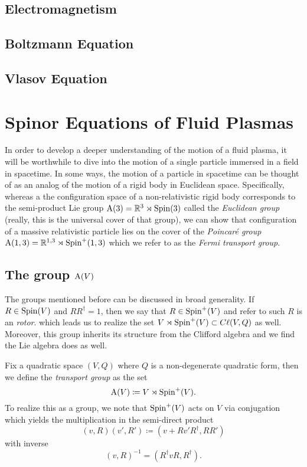 \documentclass[conf]{new-aiaa}
\begin{document}
\subsection{Electromagnetism}

\subsection{Boltzmann Equation}

\subsection{Vlasov Equation}

\section{Spinor Equations of Fluid Plasmas}

In order to develop a deeper understanding of the motion of a fluid plasma, it will be worthwhile to dive into the motion of a single particle immersed in a field in spacetime. In some ways, the motion of a particle in spacetime can be thought of as an analog of the motion of a rigid body in Euclidean space. Specifically, whereas a the configuration space of a non-relativistic rigid body corresponds to the semi-product Lie group $\mathrm{A}(3)=\mathbb{R}^3 \rtimes \operatorname{Spin}(3)$ called the \emph{Euclidean group} (really, this is the universal cover of that group), we can show that configuration of a massive relativistic particle lies on the cover of the \emph{Poincar\'e group} $\mathrm{A}(1,3) = \mathbb{R}^{1,3} \rtimes \operatorname{Spin}^+(1,3)$ which we refer to as the \emph{Fermi transport group}.

\subsection{The group $\operatorname{A}(V)$}

The groups mentioned before can be discussed in broad generality.  If $R\in \operatorname{Spin}(V)$ and $RR^\dagger = 1$, then we say that $R\in \operatorname{Spin}^+(V)$ and refer to such $R$ is an \emph{rotor}. which leads us to realize the set $V\rtimes \operatorname{Spin}^+(V) \subset C\ell(V,Q)$ as well. Moreover, this group inherits its structure from the Clifford algebra and we find the Lie algebra does as well. 

\begin{definition}
Fix a quadratic space $(V,Q)$ where $Q$ is a non-degenerate quadratic form, then we define the \emph{transport group} as the set
\begin{equation}
\operatorname{A}(V)\coloneqq V\rtimes \operatorname{Spin}^+(V).
\end{equation}
To realize this as a group, we note that $\operatorname{Spin}^+(V)$ acts on $V$ via conjugation which yields the multiplication in the semi-direct product
\begin{equation}
\label{eq:product_in_A}
(v,R)(v',R')\coloneqq(v+Rv'R^\dagger, RR')
\end{equation}
with inverse
\begin{equation}
(v,R)^{-1} = (R^\dagger v R, R^\dagger).
\end{equation}
\end{definition}
\end{document}
